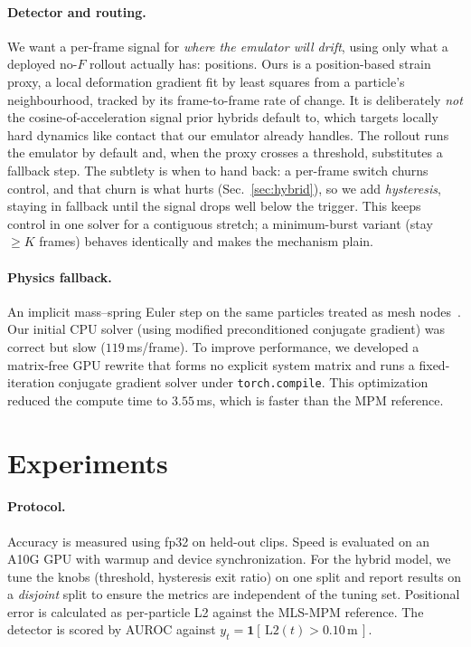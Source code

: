 \documentclass{article}
\begin{document}
\paragraph{Detector and routing.} We want a per-frame signal for \emph{where the
emulator will drift}, using only what a deployed no-$F$ rollout actually has:
positions. Ours is a position-based strain proxy, a local deformation gradient fit
by least squares from a particle's neighbourhood, tracked by its frame-to-frame rate
of change. It is deliberately \emph{not} the cosine-of-acceleration signal prior
hybrids default to, which targets locally hard dynamics like contact that our
emulator already handles. The rollout runs the emulator by default and, when the
proxy crosses a threshold, substitutes a fallback step. The subtlety is when to hand
back: a per-frame switch churns control, and that churn is what hurts (Sec.~\ref{sec:hybrid}),
so we add \emph{hysteresis}, staying in fallback until the signal drops well below
the trigger. This keeps control in one solver for a contiguous stretch; a
minimum-burst variant (stay $\ge K$ frames) behaves identically and makes the
mechanism plain.

\paragraph{Physics fallback.} An implicit mass--spring Euler step on the same
particles treated as mesh nodes~\citep{baraff1998}. Our initial CPU solver (using modified
preconditioned conjugate gradient) was correct but slow ($119$\,ms/frame). To improve performance, we developed a matrix-free GPU rewrite that forms no explicit system matrix and runs a fixed-iteration conjugate gradient solver under \texttt{torch.compile}. This optimization reduced the compute time to $3.55$\,ms, which is faster than the
MPM reference.

\section{Experiments}

\paragraph{Protocol.} Accuracy is measured using fp32 on held-out clips. Speed is evaluated on an A10G GPU with warmup and device synchronization. For the hybrid model, we tune the knobs (threshold,
hysteresis exit ratio) on one split and report results on a \emph{disjoint} split to ensure the metrics are independent of the tuning set. Positional error is calculated as per-particle L2
against the MLS-MPM reference. The detector is scored by AUROC against
$y_t = \mathbf{1}[\,\text{L2}(t) > 0.10\,\text{m}\,]$.
\end{document}
